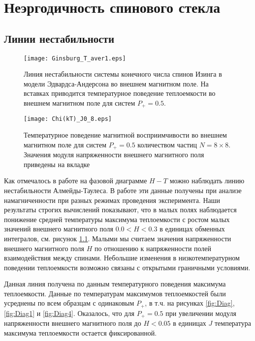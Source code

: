 \chapter{Неэргодичность спинового стекла}\label{ch:ch4}

\section{Линии нестабильности}

\begin{figure}[!ht]
	\centering
	\texttt{[image: Ginsburg\_T\_aver1.eps]}
	\caption{Линия нестабильности системы конечного числа спинов Изинга в модели Эдвардса-Андерсона во внешнем магнитном поле. На вставках приводится температурное поведение теплоемкости во внешнем магнитном поле для систем $P_{+}=0.5$.}
	\label{fig:Stable_line}
\end{figure}

\begin{figure}[!ht]
	\centering
	\texttt{[image: Chi(kT)\_J0\_8.eps]}
	\caption{Температурное поведение магнитной восприимчивости во внешнем магнитном поле для систем $P_{+}=0.5$ количеством частиц $N = 8 \times 8$. Значения модуля напряженности внешнего магнитного поля приведены на вкладке}
	\label{fig:Chi(kT)_J0_8.eps}
\end{figure}

Как отмечалось в работе \cite{takzei1984} на фазовой диаграмме $H-T$ можно наблюдать линию нестабильности Алмейды-Таулеса. В работе \cite{takzei1984} эти данные получены при анализе намагниченности при разных режимах проведения эксперимента. Наши результаты строгих вычислений показывают, что в малых полях наблюдается понижение средней температуры максимума теплоемкости с ростом малых значений внешнего магнитного поля $0.0<H<0.3$ в единицах обменных интегралов, см. рисунок \ref{fig:Stable_line}. Малыми мы считаем значения напряженности внешнего магнитного поля $H$ по отношению к напряженности полей взаимодействия между спинами. Небольшие изменения в низкотемпературном поведении теплоемкости возможно связаны с открытыми граничными условиями.


Данная линия получена по данным температурного поведения максимума теплоемкости. Данные по температурам максимумов теплоемкостей были усреднены по всем образцам с одинаковым $P_{+}$, в т.ч. на рисунках \ref{fig:Diag}, \ref{fig:Diag1} и \ref{fig:Diag4}. Оказалось, что для $P_{+}=0.5$ при увеличении модуля напряженности внешнего магнитного поля до $H<0.05$ в единицах $J$ температура максимума теплоемкости остается фиксированной. 

